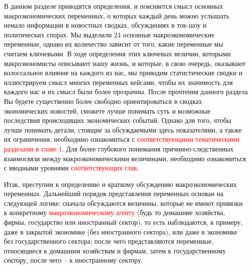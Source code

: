 \documentclass[12pt,a4paper]{article}
\begin{document}
В данном разделе приводятся определения, и поясняется смысл основных макроэкономических переменных, о которых каждый день можно услышать немало информации в новостных сводках, обсуждениях в ток-шоу и политических спорах. Мы выделили 24 основные макроэкономические переменные, однако их количество зависит от того, какие переменные мы считаем ключевыми. В ходе определения этих ключевых величин, которыми макроэкономисты описывают нашу жизнь, и которые, в свою очередь, оказывают колоссальное влияние на каждого из нас, мы приводим статистические сводки и иллюстрируем смысл многих переменных кейсами, чтобы их значимость для каждого нас и их смысл были более прозрачны. 
После прочтения данного раздела Вы будете существенно более свободно ориентироваться в сводках экономических новостей, сможете лучше понимать суть и возможные последствия происходящих экономических событий. Однако для того, чтобы лучше понимать детали, стоящие за обсуждаемыми здесь показателями, а также их ограничения, необходимо ознакомиться с \textcolor{red}{соответствующими тематическими разделами в главе 1}. Для более глубокого понимания причинно-следственных взаимосвязи между макроэкономическими величинами, необходимо ознакомиться с вводными уровнями \textcolor{red}{соответствующих глав}.

Итак, преступим к определению и краткому обсуждению макроэкономических переменных. Дальнейший порядок представления переменных основан на следующей логике: сначала обсуждаются величины, которые не имеют привязки к конкретному \textcolor{red}{макроэкономическому агенту} (будь то домашние хозяйства, фирмы, государство или иностранный сектор), то есть наблюдаются, к примеру, даже в закрытой экономике (без иностранного сектора), или даже в экономике без государственного сектора; после чего представляются переменные, относящиеся к домашним хозяйствам и фирмам, затем к государственному сектору, после чего – к иностранному сектору.
\end{document}
